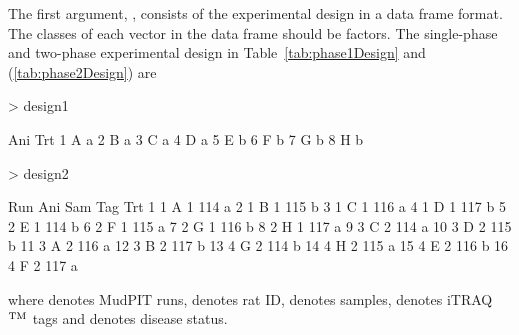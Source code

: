 \documentclass[article]{jss}
\begin{document}
The first argument, , consists of the experimental design in a data frame format. The classes of each vector in the data frame should be factors. The single-phase and two-phase experimental design in Table~\ref{tab:phase1Design} and (\ref{tab:phase2Design}) are
\begin{CodeChunk}
\begin{CodeInput}
> design1
\end{CodeInput}
\begin{CodeOutput}
  Ani Trt
1   A   a
2   B   a
3   C   a
4   D   a
5   E   b
6   F   b
7   G   b
8   H   b
\end{CodeOutput}
\begin{CodeInput}
> design2
\end{CodeInput}
\begin{CodeOutput}
   Run Ani Sam Tag Trt
1    1   A   1 114   a
2    1   B   1 115   b
3    1   C   1 116   a
4    1   D   1 117   b
5    2   E   1 114   b
6    2   F   1 115   a
7    2   G   1 116   b
8    2   H   1 117   a
9    3   C   2 114   a
10   3   D   2 115   b
11   3   A   2 116   a
12   3   B   2 117   b
13   4   G   2 114   b
14   4   H   2 115   a
15   4   E   2 116   b
16   4   F   2 117   a
\end{CodeOutput}
\end{CodeChunk}
where  denotes MudPIT runs,  denotes rat ID,  denotes samples,  denotes iTRAQ$^{\rm TM}$ tags and  denotes disease status.
\end{document}
